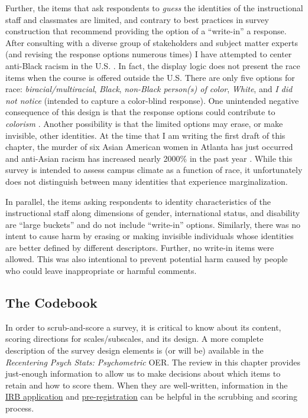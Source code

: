 \documentclass[
  english,
]{book}
\begin{document}
Further, the items that ask respondents to \emph{guess} the identities of the instructional staff and classmates are limited, and contrary to best practices in survey construction that recommend providing the option of a ``write-in'' a response. After consulting with a diverse group of stakeholders and subject matter experts (and revising the response options numerous times) I have attempted to center anti-Black racism in the U.S. \citep{mosley_critical_2021, mosley_radical_2020, singh_building_2020}. In fact, the display logic does not present the race items when the course is offered outside the U.S. There are only five options for race: \emph{biracial/multiracial}, \emph{Black}, \emph{non-Black person(s) of color}, \emph{White}, and \emph{I did not notice} (intended to capture a color-blind response). One unintended negative consequence of this design is that the response options could contribute to \emph{colorism} \citep{adames_fallacy_2021, capielo_rosario_acculturation_2019}. Another possibility is that the limited options may erase, or make invisible, other identities. At the time that I am writing the first draft of this chapter, the murder of six Asian American women in Atlanta has just occurred and anti-Asian racism has increased nearly 2000\% in the past year \citep{kim_guest_2021, kim_yes_2021, noauthor_stop_nodate}. While this survey is intended to assess campus climate as a function of race, it unfortunately does not distinguish between many identities that experience marginalization.

In parallel, the items asking respondents to identity characteristics of the instructional staff along dimensions of gender, international status, and disability are ``large buckets'' and do not include ``write-in'' options. Similarly, there was no intent to cause harm by erasing or making invisible individuals whose identities are better defined by different descriptors. Further, no write-in items were allowed. This was also intentional to prevent potential harm caused by people who could leave inappropriate or harmful comments.

\hypertarget{the-codebook}{%
\subsection{The Codebook}\label{the-codebook}}

In order to scrub-and-score a survey, it is critical to know about its content, scoring directions for scales/subscales, and its design. A more complete description of the survey design elements is (or will be) available in the \emph{Recentering Psych Stats: Psychometric} OER. The review in this chapter provides just-enough information to allow us to make decisions about which items to retain and how to score them. When they are well-written, information in the \href{./Bikos_ReCenteringPsychStats_ReCupload.pdf}{IRB application} and \href{https://osf.io/a8e5u}{pre-registration} can be helpful in the scrubbing and scoring process.
\end{document}
